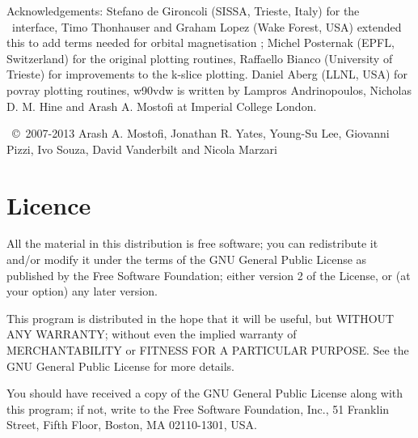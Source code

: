 Acknowledgements: Stefano de Gironcoli (SISSA, Trieste, Italy) for the
\pwscf\ interface, Timo Thonhauser and Graham Lopez (Wake Forest, USA) 
extended this to add terms needed for orbital magnetisation
; Michel Posternak (EPFL, Switzerland) for the
original plotting routines, Raffaello Bianco (University of Trieste) for improvements to the k-slice plotting. Daniel Aberg (LLNL, USA) for povray plotting routines, w90vdw is written by
Lampros Andrinopoulos, Nicholas D. M. Hine and Arash A. Mostofi at Imperial College London. 

\wannier\ \copyright\ 2007-2013 Arash A. Mostofi, Jonathan R. Yates,
Young-Su Lee, Giovanni Pizzi, Ivo Souza, David Vanderbilt and Nicola Marzari

\section*{Licence}
All the material in this distribution is free software; you can
redistribute it and/or 
modify it under the terms of the GNU General Public License
as published by the Free Software Foundation; either version 2
of the License, or (at your option) any later version.

This program is distributed in the hope that it will be useful,
but WITHOUT ANY WARRANTY; without even the implied warranty of
MERCHANTABILITY or FITNESS FOR A PARTICULAR PURPOSE.  See the
GNU General Public License for more details.

You should have received a copy of the GNU General Public License
along with this program; if not, write to the Free Software
Foundation, Inc., 51 Franklin Street, Fifth Floor, Boston, MA  02110-1301, USA.


 
